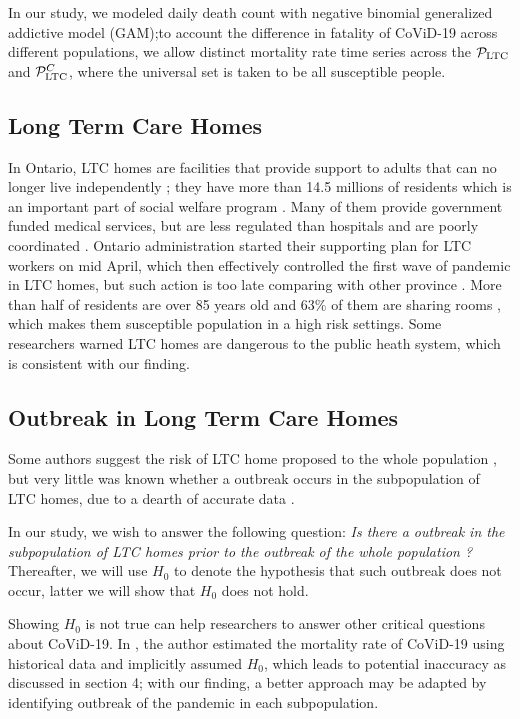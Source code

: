 \documentclass[12pt]{article}
\begin{document}
In our study, we modeled daily death count with negative binomial generalized addictive model (GAM);to account the
difference in fatality of CoViD-19 across different populations, we allow distinct mortality rate time series across the $\mathcal P_{\mathrm{LTC}}$ and $\mathcal P_{\mathrm{LTC}}^C$, where
the universal set is taken to be all susceptible people.

\subsection{Long Term Care Homes}
In Ontario, LTC homes are facilities that provide support to adults that can no longer live independently \cite{OMHL}; they have more than 14.5 millions of residents which is an important part of social welfare program \cite{hsu2020understanding}. Many of them provide government funded medical services, but are less regulated than hospitals and are poorly coordinated \cite{liu2020covid}. Ontario administration started their supporting plan for LTC workers on mid April\cite{covid19act}, which then effectively controlled
the first wave of pandemic in LTC homes, but such action is too late comparing with other province \cite{liu2020covid}.
More than half of residents are over 85 years old and $63\%$ of them are sharing rooms \cite{liu2020covid}, which makes them susceptible population in a high risk settings. Some researchers warned LTC homes are dangerous to the public heath system\cite{gardner2020coronavirus}, which is consistent with our finding.

\subsection{Outbreak in Long Term Care Homes}
Some authors suggest the risk of LTC home proposed to the whole population \cite{gardner2020coronavirus}, but very little was known whether a outbreak occurs in the subpopulation of LTC homes, due to a dearth of accurate data \cite{hsu2020understanding}.

In our study, we wish to answer the following question:
\emph{Is there a outbreak in the subpopulation of LTC homes prior to the outbreak of the whole 
population ?} Thereafter, we will use $H_0$ to denote the hypothesis that such outbreak does not occur, latter we will show that $H_0$ does not hold.

Showing $H_0$ is not true can help researchers to answer other critical questions about CoViD-19. In \cite{liu2020covid}, the author estimated the mortality rate of CoViD-19 using historical data and implicitly assumed $H_0$, which leads to potential inaccuracy as discussed in section 4; with our finding, a better approach may be adapted by identifying outbreak of the pandemic in each subpopulation.
\end{document}
